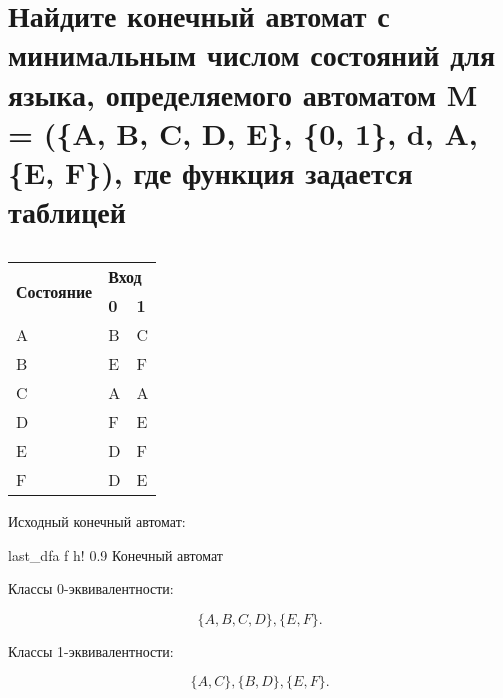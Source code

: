 \section{Найдите конечный автомат с минимальным числом состояний для языка, определяемого автоматом M = (\{A, B, C, D, E\}, \{0, 1\}, d, A, \{E, F\}), где функция задается таблицей}

\newpage

\begin{table}[h!]
\caption{}
\label{tab:my-table}
\begin{tabular}{|l|ll|}
\hline
\multirow{2}{*}{\textbf{Состояние}} & \multicolumn{2}{l|}{\textbf{Вход}}           \\ \cline{2-3} 
                                    & \multicolumn{1}{l|}{\textbf{0}} & \textbf{1} \\ \hline
A                                   & \multicolumn{1}{l|}{B}          & C          \\ \hline
B                                   & \multicolumn{1}{l|}{E}          & F          \\ \hline
C                                   & \multicolumn{1}{l|}{A}          & A          \\ \hline
D                                   & \multicolumn{1}{l|}{F}          & E          \\ \hline
E                                   & \multicolumn{1}{l|}{D}          & F          \\ \hline
F                                   & \multicolumn{1}{l|}{D}          & E          \\ \hline
\end{tabular}
\end{table}

Исходный конечный автомат:

    {last_dfa}
    {f}
    {h!}
    {0.9\textwidth}
    {Конечный автомат}

Классы 0-эквивалентности:

\begin{equation*}
\{A, B, C, D\}, \{E, F\}.
\end{equation*}

Классы 1-эквивалентности:

\begin{equation*}
\{A, C\}, \{B, D\}, \{E, F\}.
\end{equation*}

